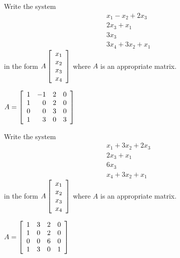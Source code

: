 \begin{enumialphparenastyle}
\begin{ex} Write the system
\begin{equation*}
\begin{array}{c}
x_{1}-x_{2}+2x_{3} \\
2x_{3}+x_{1} \\
3x_{3} \\
3x_{4}+3x_{2}+x_{1}
\end{array}
\end{equation*}
 in the form $A\left[
\begin{array}{c}
x_{1} \\
x_{2} \\
x_{3} \\
x_{4}
\end{array}
\right] $ where $A$ is an appropriate matrix.
\begin{sol}
$A=\left[
\begin{array}{rrrr}
1 & -1 & 2 & 0 \\
1 & 0 & 2 & 0 \\
0 & 0 & 3 & 0 \\
1 & 3 & 0 & 3
\end{array}
\right] $
\end{sol}
\end{ex}

\begin{ex} Write the system
\begin{equation*}
\begin{array}{c}
x_{1}+3x_{2}+2x_{3} \\
2x_{3}+x_{1} \\
6x_{3} \\
x_{4}+3x_{2}+x_{1}
\end{array}
\end{equation*}
 in the form $A\left[
\begin{array}{c}
x_{1} \\
x_{2} \\
x_{3} \\
x_{4}
\end{array}
\right] $ where $A$ is an appropriate matrix.
\begin{sol}
$A=\left[
\begin{array}{rrrr}
1 & 3 & 2 & 0 \\
1 & 0 & 2 & 0 \\
0 & 0 & 6 & 0 \\
1 & 3 & 0 & 1
\end{array}
\right]$
\end{sol}
\end{ex}


\end{enumialphparenastyle}
